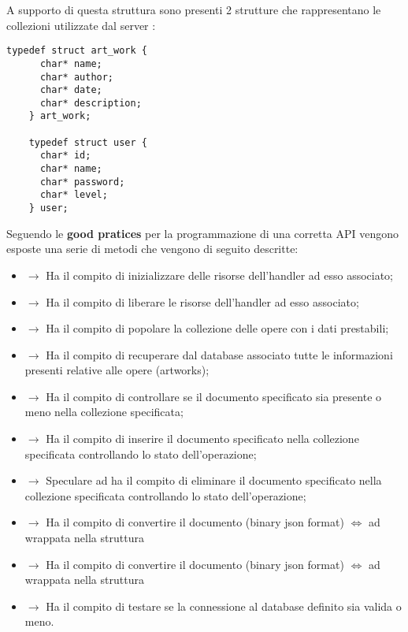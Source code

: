   A supporto di questa struttura sono presenti 2 strutture che rappresentano le collezioni utilizzate dal server \footnotemark {} :

  \begin{lstlisting}[language={[POSIX]C}, style=wnumbers]
    typedef struct art_work {
      char* name;
      char* author;
      char* date;
      char* description;
    } art_work;

    typedef struct user {
      char* id;
      char* name;
      char* password;
      char* level;
    } user;
  \end{lstlisting}


  Seguendo le \textbf{good pratices} per la programmazione di una corretta API vengono esposte una serie di metodi che vengono di seguito descritte:

  \begin{itemize}
    \item {} $\rightarrow$ Ha il compito di inizializzare delle risorse dell'handler ad esso associato;
    \item {} $\rightarrow$ Ha il compito di liberare le risorse dell'handler ad esso associato;
    \item {} $\rightarrow$ Ha il compito di popolare la collezione delle opere con i dati prestabili;
    \item {} $\rightarrow$ Ha il compito di recuperare dal database associato tutte le informazioni presenti relative alle opere (artworks);
    \item {} $\rightarrow$ Ha il compito di controllare se il documento specificato sia presente o meno nella collezione specificata;
    \item {} $\rightarrow$ Ha il compito di inserire il documento specificato nella collezione specificata controllando lo stato dell'operazione;
    \item {} $\rightarrow$ Speculare ad  ha il compito di eliminare il documento specificato nella collezione specificata controllando lo stato dell'operazione;
    \item {} $\rightarrow$ Ha il compito di convertire il documento  (binary json format) $\Longleftrightarrow$ ad  wrappata nella struttura 
    \item {} $\rightarrow$ Ha il compito di convertire il documento  (binary json format) $\Longleftrightarrow$ ad  wrappata nella struttura 
    \item {} $\rightarrow$ Ha il compito di testare se la connessione al database definito sia valida o meno.
  \end{itemize}

